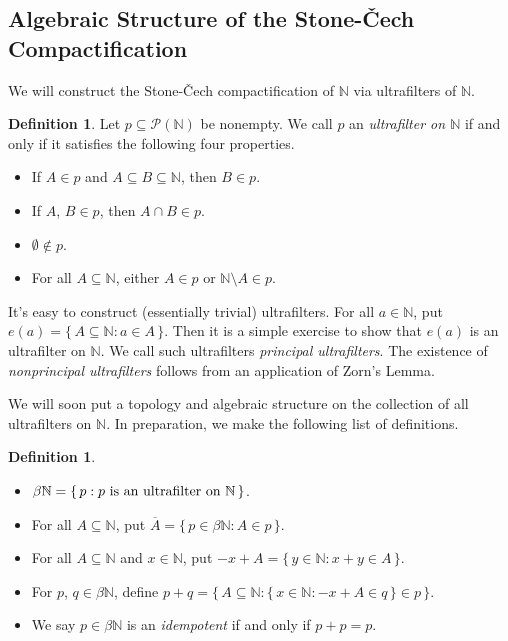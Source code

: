 \documentclass[12pt]{article}
\theoremstyle{plain}
\theoremstyle{definition}
\newtheorem{defn}[thm]{Definition}
\newcommand{\bbN}{\mathbb{N}}
\begin{document}
\subsection{Algebraic Structure of the Stone-\v{C}ech Compactification}
We will construct the Stone-\v{C}ech compactification of $\bbN$ via
ultrafilters of $\bbN$.
  \begin{defn}
    Let $p \subseteq \mathcal{P}(\bbN)$ be nonempty.
    We call $p$ an \textsl{ultrafilter on $\bbN$} if and only if it
    satisfies the following four properties.
      \begin{itemize}
        \item[(1)] If $A \in p$ and $A \subseteq B \subseteq \bbN$,
          then $B \in p$.
        \item[(2)] If $A$, $B \in p$, then $A \cap B \in p$.
        \item[(3)] $\emptyset \not\in p$.
        \item[(4)] For all $A \subseteq \bbN$, either $A \in p$ or
          $\bbN \setminus A \in p$.
      \end{itemize}
  \end{defn}
It's easy to construct (essentially trivial) ultrafilters. 
For all $a \in \bbN$, put $e(a) = \{\, A \subseteq \bbN : a \in A
\,\}$.
Then it is a simple exercise to show that $e(a)$ is an ultrafilter on
$\bbN$. 
We call such ultrafilters \textsl{principal ultrafilters}. 
The existence of \textsl{nonprincipal ultrafilters} follows from an
application of Zorn's Lemma. 

We will soon put a topology and algebraic structure on the collection
of all ultrafilters on $\bbN$. 
In preparation, we make the following list of definitions.

  \begin{defn}
    \begin{itemize}
      \item[(a)] $\beta\bbN = \{\, p : \hbox{$p$ is an ultrafilter on
          $\bbN$} \,\}$.
      \item[(b)] For all $A \subseteq \bbN$, put $\overline{A} = \{\,
        p \in \beta\bbN : A \in p \,\}$.
      \item[(c)] For all $A \subseteq \bbN$ and $x \in \bbN$, put
        $-x+A = \{\, y \in \bbN : x+y \in A \,\}$.
      \item[(d)] For $p$, $q \in \beta\bbN$, define
        $p+q = \bigl\{\, A \subseteq \bbN : \{\, x \in \bbN : -x +A \in q
        \,\} \in p \,\bigr\}$.
      \item[(e)] We say $p \in \beta\bbN$ is an \textsl{idempotent} if
        and only if $p + p = p$.
    \end{itemize}
  \end{defn}
\end{document}
